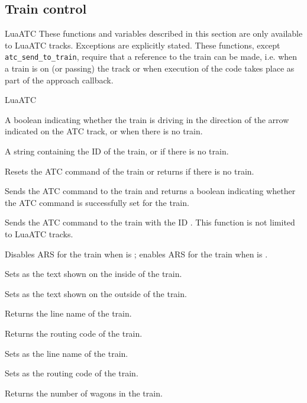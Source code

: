 \subsection{Train control}{LuaATC}
These functions and variables described in this section are only available to LuaATC tracks. Exceptions are explicitly stated. These functions, except \texttt{atc\_send\_to\_train}, require that a reference to the train can be made, i.e. when a train is on (or passing) the track or when execution of the code takes place as part of the approach callback.
\begin{apidoc}{LuaATC}
\item {} A boolean indicating whether the train is driving in the direction of the arrow indicated on the ATC track, or \luanil{} when there is no train.
\item {} A string containing the ID of the train, or \luanil{} if there is no train.
\item {} Resets the ATC command of the train or returns \luafalse{} if there is no train.
\item {} Sends the ATC command  to the train and returns a boolean indicating whether the ATC command is successfully set for the train.
\item {} Sends the ATC command  to the train with the ID . This function is not limited to LuaATC tracks.
\item {} Disables ARS for the train when  is \luatrue{}; enables ARS for the train when  is \luafalse{}.
\item {} Sets  as the text shown on the inside of the train.
\item {} Sets  as the text shown on the outside of the train.
\item {} Returns the line name of the train.
\item {} Returns the routing code of the train.
\item {} Sets  as the line name of the train.
\item {} Sets  as the routing code of the train.
\item {} Returns the number of wagons in the train.
\end{apidoc}


